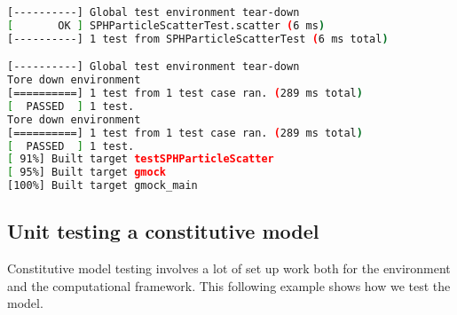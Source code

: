 \begin{enumerate}
\begin{lstlisting}[language=sh, backgroundcolor=\color{background}]
[----------] Global test environment tear-down
[       OK ] SPHParticleScatterTest.scatter (6 ms)
[----------] 1 test from SPHParticleScatterTest (6 ms total)

[----------] Global test environment tear-down
Tore down environment
[==========] 1 test from 1 test case ran. (289 ms total)
[  PASSED  ] 1 test.
Tore down environment
[==========] 1 test from 1 test case ran. (289 ms total)
[  PASSED  ] 1 test.
[ 91%] Built target testSPHParticleScatter
[ 95%] Built target gmock
[100%] Built target gmock_main
\end{lstlisting}
\end{enumerate}

\subsection{Unit testing a constitutive model}
Constitutive model testing involves a lot of set up work both for the 
environment and the computational framework.  This following example
shows how we test the  model.
